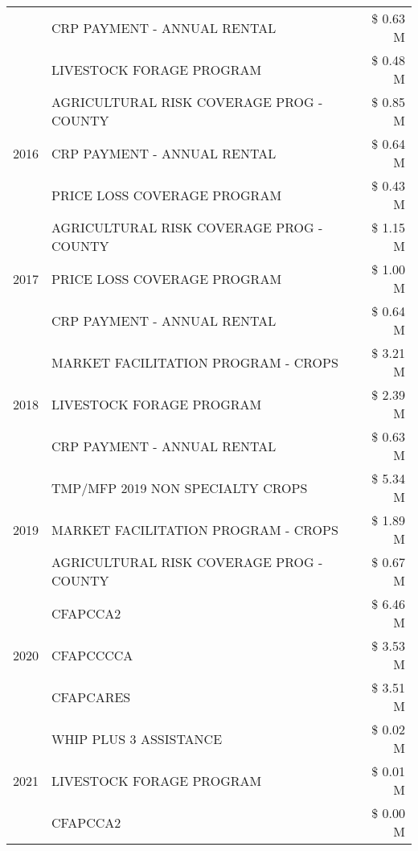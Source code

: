 \begin{tabular}{llr}
 & CRP PAYMENT - ANNUAL RENTAL & \$ 0.63 M \\
 & LIVESTOCK FORAGE PROGRAM & \$ 0.48 M \\
\cline{1-3}
\multirow[t]{3}{*}{2016} & AGRICULTURAL RISK COVERAGE PROG - COUNTY & \$ 0.85 M \\
 & CRP PAYMENT - ANNUAL RENTAL & \$ 0.64 M \\
 & PRICE LOSS COVERAGE PROGRAM & \$ 0.43 M \\
\cline{1-3}
\multirow[t]{3}{*}{2017} & AGRICULTURAL RISK COVERAGE PROG - COUNTY & \$ 1.15 M \\
 & PRICE LOSS COVERAGE PROGRAM & \$ 1.00 M \\
 & CRP PAYMENT - ANNUAL RENTAL & \$ 0.64 M \\
\cline{1-3}
\multirow[t]{3}{*}{2018} & MARKET FACILITATION PROGRAM - CROPS & \$ 3.21 M \\
 & LIVESTOCK FORAGE PROGRAM & \$ 2.39 M \\
 & CRP PAYMENT - ANNUAL RENTAL & \$ 0.63 M \\
\cline{1-3}
\multirow[t]{3}{*}{2019} & TMP/MFP 2019 NON SPECIALTY CROPS & \$ 5.34 M \\
 & MARKET FACILITATION PROGRAM - CROPS & \$ 1.89 M \\
 & AGRICULTURAL RISK COVERAGE PROG - COUNTY & \$ 0.67 M \\
\cline{1-3}
\multirow[t]{3}{*}{2020} & CFAPCCA2 & \$ 6.46 M \\
 & CFAPCCCCA & \$ 3.53 M \\
 & CFAPCARES & \$ 3.51 M \\
\cline{1-3}
\multirow[t]{3}{*}{2021} & WHIP PLUS 3 ASSISTANCE & \$ 0.02 M \\
 & LIVESTOCK FORAGE PROGRAM & \$ 0.01 M \\
 & CFAPCCA2 & \$ 0.00 M \\
\cline{1-3}
\bottomrule
\end{tabular}
